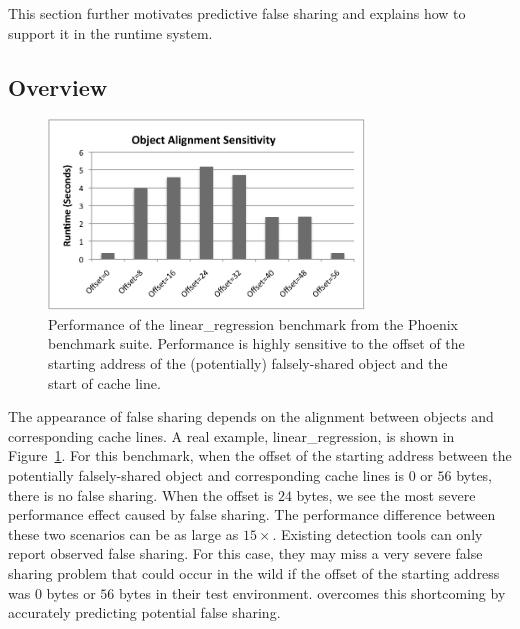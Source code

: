 \label{sec:prediction}
This section further motivates predictive false sharing and explains how to support it in the runtime system.  

\subsection{Overview}
\label{sec:predictoverview}

\begin{figure}[!t]
\begin{center}
\includegraphics[width=3.3in]{predator/figure/perfsensitive}
\end{center}
\caption{
Performance of the linear\_regression benchmark from the Phoenix benchmark suite.
Performance is highly sensitive to the offset of the starting address of the (potentially) falsely-shared object 
and the start of cache line. 
\label{fig:perfsensitive}}
\end{figure}

The appearance of false sharing depends on 
the alignment between objects and corresponding cache lines.
A real example, linear\_regression, is shown in Figure~\ref{fig:perfsensitive}.
For this benchmark,
when the offset of the starting address between the potentially falsely-shared object and corresponding cache lines 
is $0$ or $56$ bytes, 
there is no false sharing. 
When the offset is $24$ bytes, we see the most severe performance effect caused 
by false sharing. 
The performance difference between these two scenarios can be as large as $15\times$. 
Existing detection tools can only report observed false sharing.
For this case, they may miss a very severe false sharing problem that could occur in the wild if the offset of the starting 
address was $0$ bytes or $56$ bytes in their test environment.
\Predator{} overcomes this shortcoming by accurately predicting potential false sharing.

